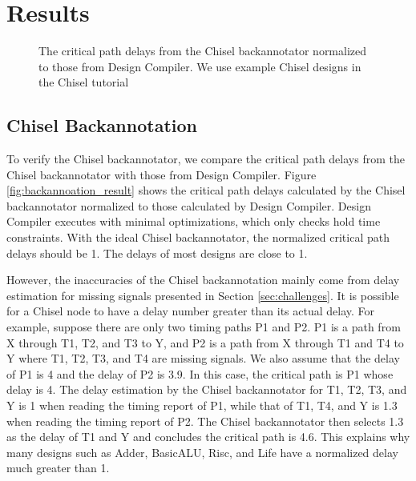 \section{Results}
\begin{figure}
	\centering
    \caption{The critical path delays from the Chisel backannotator normalized to those from Design Compiler. We use example Chisel designs in the Chisel tutorial}
	\label{fig:backannotation_result}
\end{figure}
\subsection{Chisel Backannotation}
To verify the Chisel backannotator, we compare the critical path delays from the Chisel backannotator with those from Design Compiler. Figure \ref{fig:backannoation_result} shows the critical path delays calculated by the Chisel backannotator normalized to those calculated by Design Compiler. Design Compiler executes with minimal optimizations, which only checks hold time constraints. With the ideal Chisel backannotator, the normalized critical path delays should be 1. The delays of most designs are close to 1.

However, the inaccuracies of the Chisel backannotation mainly come from delay estimation for missing signals presented in Section \ref{sec:challenges}. It is possible for a Chisel node to have a delay number greater than its actual delay. For example, suppose there are only two timing paths P1 and P2. P1 is a path from X through T1, T2, and T3 to Y, and P2 is a path from X through T1 and T4 to Y where T1, T2, T3, and T4 are missing signals. We also assume that the delay of P1 is 4 and the delay of P2 is 3.9. In this case, the critical path is P1 whose delay is 4. The delay estimation by the Chisel backannotator for T1, T2, T3, and Y is 1 when reading the timing report of P1, while that of T1, T4, and Y is 1.3 when reading the timing report of P2. The Chisel backannotator then selects 1.3 as the delay of T1 and Y and concludes the critical path is 4.6. This explains why many designs such as Adder, BasicALU, Risc, and Life have a normalized delay much greater than 1.

